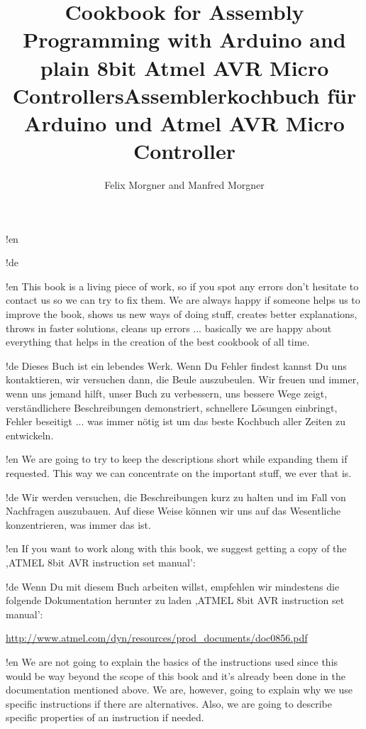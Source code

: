 \documentclass[twoside,12pt,authoryear,openright]{book}
\begin{document}

!en \title{Cookbook for Assembly Programming with Arduino and plain 8bit Atmel AVR Micro Controllers}
!de \title{Assemblerkochbuch für Arduino und Atmel AVR Micro Controller}

\author{Felix Morgner and Manfred Morgner}


\maketitle

!en This book is a living piece of work, so if you spot any errors don't hesitate to contact us so we can try to fix them. We are always happy if someone helps us to improve the book, shows us new ways of doing stuff, creates better explanations, throws in faster solutions, cleans up errors ... basically we are happy about everything that helps in the creation of the best cookbook of all time.

!de Dieses Buch ist ein lebendes Werk. Wenn Du Fehler findest kannst Du uns kontaktieren, wir versuchen dann, die Beule auszubeulen. Wir freuen und immer, wenn uns jemand hilft, unser Buch zu verbessern, uns bessere Wege zeigt, verständlichere Beschreibungen demonstriert, schnellere Lösungen einbringt, Fehler beseitigt ... was immer nötig ist um das beste Kochbuch aller Zeiten zu entwickeln.


!en We are going to try to keep the descriptions short while expanding them if requested. This way we can concentrate on the important stuff, we ever that is.

!de Wir werden versuchen, die Beschreibungen kurz zu halten und im Fall von Nachfragen auszubauen. Auf diese Weise können wir uns auf das Wesentliche konzentrieren, was immer das ist.



!en If you want to work along with this book, we suggest getting a copy of the ,ATMEL 8bit AVR instruction set manual':

!de Wenn Du mit diesem Buch arbeiten willst, empfehlen wir mindestens die folgende Dokumentation herunter zu laden ,ATMEL 8bit AVR instruction set manual':

\url{http://www.atmel.com/dyn/resources/prod_documents/doc0856.pdf}



!en We are not going to explain the basics of the instructions used since this would be way beyond the scope of this book and it's already been done in the documentation mentioned above. We are, however, going to explain why we use specific instructions if there are alternatives. Also, we are going to describe specific properties of an instruction if needed.
\end{document}
